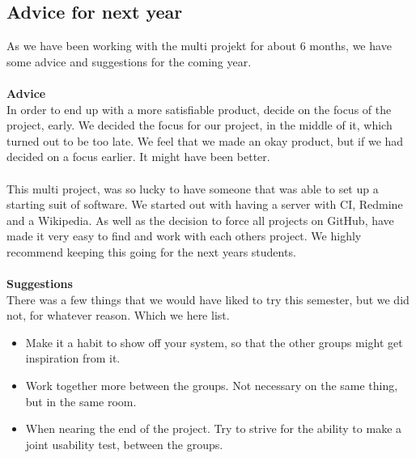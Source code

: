 \subsection{Advice for next year}
As we have been working with the multi projekt for about 6 months, we have some advice and suggestions for the coming year.\\
\\
\textbf{Advice}\\
In order to end up with a more satisfiable product, decide on the focus of the project, early. We decided the focus for our project, in the middle of it, which turned out to be too late. We feel that we made an okay product, but if we had decided on a focus earlier. It might have been better.\\
\\
This multi project, was so lucky to have someone that was able to set up a starting suit of software. We started out with having a server with CI, Redmine and a Wikipedia. As well as the decision to force all projects on GitHub, have made it very easy to find and work with each others project. We highly recommend keeping this going for the next years students.\\
\\
\textbf{Suggestions}\\
There was a few things that we would have liked to try this semester, but we did not, for whatever reason. Which we here list.

\begin{itemize}
	\item Make it a habit to show off your system, so that the other groups might get inspiration from it.
	\item Work together more between the groups. Not necessary on the same thing, but in the same room.
	\item When nearing the end of the project. Try to strive for the ability to make a joint usability test, between the groups.
\end{itemize}


